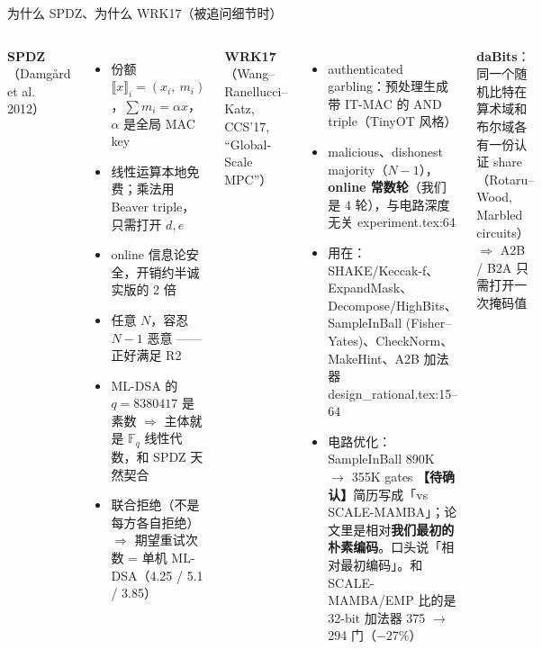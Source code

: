 \documentclass[aspectratio=169,10pt,fontset=none]{ctexbeamer}
\newcommand{\warn}[1]{{\color{warn}\textbf{【待确认】}#1}}
\newcommand{\src}[1]{{\scriptsize\color{gray}#1}}
\begin{document}
\begin{frame}{为什么 SPDZ、为什么 WRK17（被追问细节时）}
\begin{columns}[T]
\textbf{SPDZ}（Damgård et al. 2012）
\begin{itemize}
  \item 份额 $\llbracket x\rrbracket_i=(x_i,\ m_i)$，$\sum m_i=\alpha x$，$\alpha$ 是全局 MAC key
  \item 线性运算本地免费；乘法用 Beaver triple，只需打开 $d,e$
  \item online 信息论安全，开销约半诚实版的 2 倍
  \item 任意 $N$，容忍 $N-1$ 恶意 —— 正好满足 R2
  \item ML-DSA 的 $q=8380417$ 是素数 $\Rightarrow$ 主体就是 $\mathbb F_q$ 线性代数，和 SPDZ 天然契合
  \item 联合拒绝（不是每方各自拒绝）$\Rightarrow$ 期望重试次数 = 单机 ML-DSA（4.25 / 5.1 / 3.85）
\end{itemize}
\textbf{WRK17}（Wang–Ranellucci–Katz, CCS'17, ``Global-Scale MPC''）
\begin{itemize}
  \item authenticated garbling：预处理生成带 IT-MAC 的 AND triple（TinyOT 风格）
  \item malicious、dishonest majority（$N-1$），\textbf{online 常数轮}（我们是 4 轮），与电路深度无关 \src{experiment.tex:64}
  \item 用在：SHAKE/Keccak-f、ExpandMask、Decompose/HighBits、SampleInBall (Fisher–Yates)、CheckNorm、MakeHint、A2B 加法器 \src{design\_rational.tex:15--64}
  \item 电路优化：SampleInBall 890K $\to$ 355K gates
        \warn{简历写成「vs SCALE-MAMBA」；论文里是相对\textbf{我们最初的朴素编码}。口头说「相对最初编码」。和 SCALE-MAMBA/EMP 比的是 32-bit 加法器 375 $\to$ 294 门（$-27\%$）}
\end{itemize}
\textbf{daBits}：同一个随机比特在算术域和布尔域各有一份认证 share（Rotaru–Wood, Marbled circuits）$\Rightarrow$ A2B / B2A 只需打开一次掩码值
\end{columns}
\end{frame}
\end{document}
